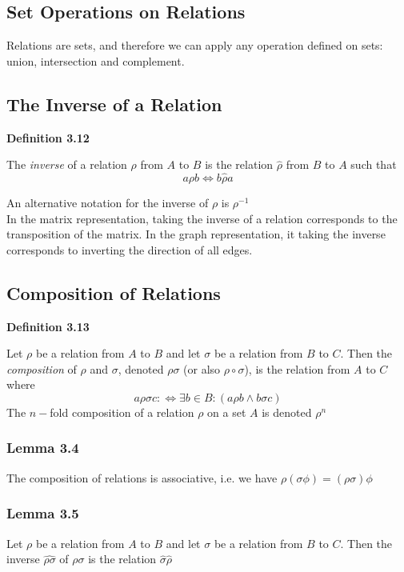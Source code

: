 \documentclass[a4paper]{report}
\newenvironment{definition}[1]{\begin{framed}\centerline{\textbf{Definition #1}}\noindent\hspace{-1.1mm}}{\end{framed}}
\begin{document}
\subsection{Set Operations on Relations}
Relations are sets, and therefore we can apply any operation defined on sets: union, intersection and complement. 

\subsection{The Inverse of a Relation}
\begin{definition}{3.12}
The \emph{inverse} of a relation $\rho$ from $A$ to $B$ is the relation $\widehat{\rho}$ from $B$ to $A$ such that \[a\rho b\Longleftrightarrow b\widehat{\rho} a\]
\end{definition}
An alternative notation for the inverse of $\rho$ is $\rho^{-1}$\\

In the matrix representation, taking the inverse of a relation corresponds to the transposition of the matrix. In the graph representation, it taking the inverse corresponds to inverting the direction of all edges.

\subsection{Composition of Relations}
\begin{definition}{3.13}
Let $\rho$ be a relation from $A$ to $B$ and let $\sigma$ be a relation from $B$ to $C$. Then the \emph{composition} of $\rho$ and $\sigma$, denoted $\rho\sigma$ (or also $\rho\circ\sigma$), is the relation from $A$ to $C$ where \[a\rho\sigma c:\Longleftrightarrow\exists b\in B:(a\rho b\land b\sigma c)\]
The $n-$fold composition of a relation $\rho$ on a set $A$ is denoted $\rho^n$
\end{definition}

\subsubsection*{Lemma 3.4}
The composition of relations is associative, i.e. we have $\rho(\sigma\phi)=(\rho\sigma)\phi$

\subsubsection*{Lemma 3.5}
Let $\rho$ be a relation from $A$ to $B$ and let $\sigma$ be a relation from $B$ to $C$. Then the inverse $\widehat{\rho\sigma}$ of $\rho\sigma$ is the relation $\widehat{\sigma}\widehat{\rho}$
\end{document}
